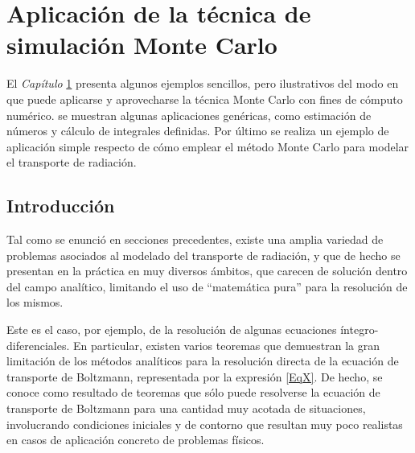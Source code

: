 \chapter{Aplicaci\'on de la t\'ecnica de simulaci\'on Monte Carlo}
\label{CapVII}

El \textit{Cap\'itulo} \ref{CapVII} presenta algunos ejemplos sencillos, pero ilustrativos del modo en que puede aplicarse y aprovecharse la 
t\'ecnica Monte Carlo con fines de c\'omputo num\'erico. se muestran algunas aplicaciones gen\'ericas, como estimaci\'on de n\'umeros y 
c\'alculo de integrales definidas. Por \'ultimo se realiza un ejemplo de aplicaci\'on simple respecto de c\'omo emplear el m\'etodo Monte 
Carlo para modelar el transporte de radiaci\'on.

\section{Introducci\'on}
\label{CapVII_1}

Tal como se enunci\'o en secciones precedentes, existe una amplia variedad de problemas asociados al modelado del transporte de radiaci\'on,
y que de hecho se presentan en la pr\'actica en muy diversos \'ambitos, que carecen de soluci\'on dentro del campo anal\'itico, limitando 
el uso de ``matem\'atica pura'' para la resoluci\'on de los mismos. 
%

Este es el caso, por ejemplo, de la resoluci\'on de algunas ecuaciones \'integro-diferenciales. En particular, existen varios teoremas que 
demuestran la gran limitaci\'on de los m\'etodos anal\'iticos para la resoluci\'on directa de la ecuaci\'on de transporte de Boltzmann, 
representada por la expresi\'on \ref{EqX}. De hecho, se conoce como resultado de teoremas que s\'olo puede resolverse la ecuaci\'on de 
transporte de Boltzmann para una cantidad muy acotada de situaciones, involucrando condiciones iniciales y de contorno que resultan muy poco 
realistas en casos de aplicaci\'on concreto de problemas f\'isicos.
%

